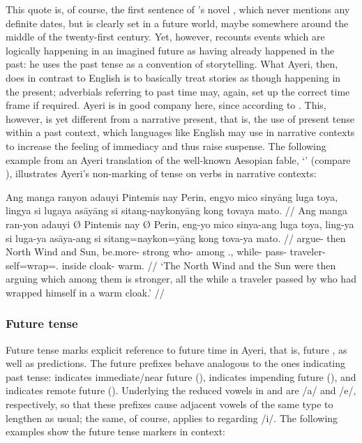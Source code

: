 This quote is, of course, the first sentence of 
\citeauthor{gibson:neuromancer}'s novel , which 
never mentions any definite dates, but is clearly set in a future world, maybe 
somewhere around the middle of the twenty-first century. Yet, however, 
\citeauthor{gibson:neuromancer} recounts events which are logically happening in 
an imagined future as having already happened in the past: he uses the past 
tense as a convention of storytelling. What Ayeri, then, does in contrast to 
English is to basically treat stories as though happening in the present; 
adverbials referring to past time may, again, set up the correct time frame if 
required. Ayeri is in good company here, since according to 
\citeauthor{dahl1985} . This, however, is yet 
different from a narrative present, that is, the use of present tense 
within a past context, which languages like English may use in narrative 
contexts to increase the feeling of immediacy and thus raise suspense. The 
following example from an Ayeri translation of the well-known Aesopian fable, 
`' (compare \cite{aesop:northwind}), 
illustrates Ayeri's non-marking of tense on verbs in narrative contexts:

\ex
\begingl
	\gla Ang manga ranyon adauyi {} Pintemis nay {} Perin, engyo mico 
		sinyāng luga toya, lingya si lugaya asāyāng si sitang-naykonyāng 
		kong tovaya mato. //
	\glb Ang manga ran-yon adauyi Ø  Pintemis nay Ø Perin, eng-yo mico 
		sinya-ang luga toya, ling-ya si luga-ya asāya-ang si 
		sitang=naykon=yāng kong tova-ya mato. //
	\glc \AgtT{} \Prog{} argue-\TplN{} then \Top{} {North Wind} and 
		\Top{} Sun, be.more-\TsgN{} strong who-\Aarg{} among 
		\TplN{}.\Loc{}, while-\Loc{} \Rel{} pass-\TsgM{} 
		traveler-\Aarg{} \Rel{} self=wrap=\TsgM{}.\Aarg{} inside 
		cloak-\Loc{} warm. //
	\glft `The North Wind and the Sun were then arguing which among them is 
		stronger, all the while a traveler passed by who had wrapped 
		himself in a warm cloak.' //
\endgl
\xe


\subsubsection{Future tense}
Future tense marks explicit reference to future time in Ayeri, that is, future 
, as well 
as predictions. The future prefixes behave analogous to the ones indicating 
past tense:  indicates immediate/near future (\NFut{}), 
 indicates impending future (\Fut{}), and  
indicates remote future (\RFut{}). Underlying the reduced vowels in 
 and  are /a/ and /e/, respectively, so that these 
prefixes cause adjacent vowels of the same type to lengthen as 
usual; the same, of course, applies to  
regarding /i/. The following examples show the future tense markers in context:


